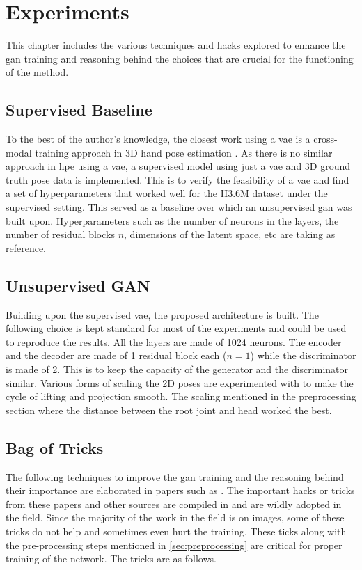\chapter{Experiments}
\label{chap:experiments}
This chapter includes the various techniques and hacks explored to enhance the \ac{gan} training and reasoning behind the choices that are crucial for the functioning of the method.%


\section{Supervised Baseline}
To the best of the author's knowledge, the closest work using a \ac{vae} is a cross-modal training approach in 3D hand pose estimation \cite{crossmodal}. As there is no similar approach in \ac{hpe} using a \ac{vae}, a supervised model using just a \ac{vae} and 3D ground truth pose data is implemented. This is to verify the feasibility of a \ac{vae} and find a set of hyperparameters that worked well for the H3.6M dataset under the supervised setting. This served as a baseline over which an unsupervised \ac{gan} was built upon. Hyperparameters such as the number of neurons in the layers, the number of residual blocks $n$, dimensions of the latent space, etc are taking as reference.

\section{Unsupervised GAN}
Building upon the supervised \ac{vae}, the proposed architecture is built. The following choice is kept standard for most of the experiments and could be used to reproduce the results. All the layers are made of 1024 neurons. The encoder and the decoder are made of 1 residual block each ($n = 1$) while the discriminator is made of 2. This is to keep the capacity of the generator and the discriminator similar. Various forms of scaling the 2D poses are experimented with to make the cycle of lifting and projection smooth. The scaling mentioned in the preprocessing section where the distance between the root joint and head worked the best. %

\section{Bag of Tricks}
The following techniques to improve the \ac{gan} training and the reasoning behind their importance are elaborated in papers such as \cite{soumith2017wasserstein,goodfellow2014generative,openaigan2wgan,improved_gan}. The important hacks or tricks from these papers and other sources are compiled in \cite{gan_hacks} and are wildly adopted in the field. Since the majority of the work in the field is on images, some of these tricks do not help and sometimes even hurt the training. These ticks along with the pre-processing steps mentioned in \ref{sec:preprocessing} are critical for proper training of the network. The tricks are as follows. %
 
